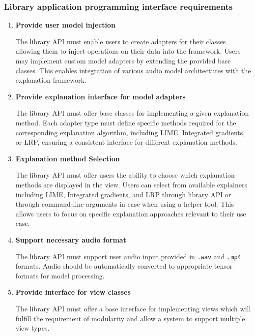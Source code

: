 \documentclass[
    bindingoffset=5mm,  %
    footnoteindent=3mm, %
    hyphenation=true    %
]{src/wut-thesis}
\begin{document}
\subsubsection{Library application programming interface requirements}
    \begin{enumerate}[itemsep=1\baselineskip]

    \item \textbf{Provide user model injection}

        The library API must enable users to create adapters for their classes allowing them to inject operations on
    their data into the framework. Users may implement custom model adapters by extending the provided base
    classes. This enables integration of various audio model architectures with the explanation
    framework.

    \item \textbf{Provide explanation interface for model adapters}

        The library API must offer base classes for implementing a given explanation method.
    Each adapter type must define specific methods required for the corresponding explanation algorithm,
    including LIME, Integrated gradients, or LRP, ensuring a consistent interface for different explanation methods.

    \item \textbf{Explanation method Selection}

        The library API must offer users the ability to choose which explanation methods are displayed in the view.
    Users can select from available explainers including LIME, Integrated gradients, and LRP through library API or through
    command-line arguments in case when using a helper tool. This allows users to focus on specific explanation
    approaches relevant to their use case.

    \item \textbf{Support necessary audio format}

        The library API must support user audio input provided in \texttt{.wav} and \texttt{.mp4} formats.
    Audio should be automatically converted to appropriate tensor formats for model processing.

    \item \textbf{Provide interface for view classes}

        The library API must offer a base interface for implementing views which will fulfill
    the requirement of modularity and allow a system to support multiple view types.


\end{enumerate}
\end{document}

